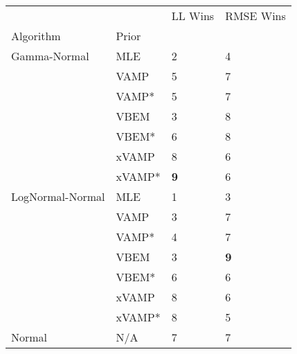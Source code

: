 \begin{tabular}{llll}
\toprule
       &     &     LL Wins &   RMSE Wins \\
Algorithm & Prior &             &             \\
\midrule
Gamma-Normal & MLE &           2 &           4 \\
       & VAMP &           5 &           7 \\
       & VAMP* &           5 &           7 \\
       & VBEM &           3 &           8 \\
       & VBEM* &           6 &           8 \\
       & xVAMP &           8 &           6 \\
       & xVAMP* &  \textbf{9} &           6 \\
LogNormal-Normal & MLE &           1 &           3 \\
       & VAMP &           3 &           7 \\
       & VAMP* &           4 &           7 \\
       & VBEM &           3 &  \textbf{9} \\
       & VBEM* &           6 &           6 \\
       & xVAMP &           8 &           6 \\
       & xVAMP* &           8 &           5 \\
Normal & N/A &           7 &           7 \\
\bottomrule
\end{tabular}

